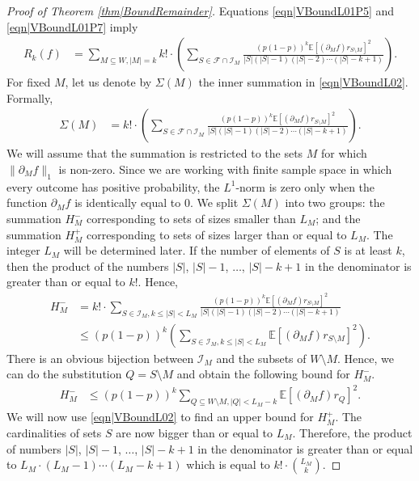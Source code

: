 \documentclass[reqno]{amsart}
\begin{document}
\begin{proof}[Proof of Theorem \ref{thm|BoundRemainder}]
Equations \eqref{eqn|VBoundL01P5} and \eqref{eqn|VBoundL01P7} imply
\begin{align}
R_k(f)
 &= \sum_{M\subseteq W, |M|=k}k!\cdot\left(\sum_{S\in\mathcal F\cap\mathcal I_M}\frac{(p(1-p))^{k}\mathbb E\left[\left(\partial_Mf\right)r_{S\setminus M}\right]^2}{|S|(|S|-1)(|S|-2)\cdots (|S|-k+1)}\right).
 \label{eqn|VBoundL02}
 \end{align}
For fixed $M$, let us denote by $\Sigma(M)$ the inner summation in \eqref{eqn|VBoundL02}. Formally, 
\begin{align}
\Sigma(M)&=k!\cdot\left(\sum_{S\in\mathcal F\cap\mathcal I_M}\frac{(p(1-p))^{k}\mathbb E\left[\left(\partial_Mf\right)r_{S\setminus M}\right]^2}{|S|(|S|-1)(|S|-2)\cdots (|S|-k+1)}\right). 
\label{eqn|DefSigmaM}
\end{align}
We will assume that the summation is restricted to the sets $M$ for which $\|\partial_Mf \|_1$ is non-zero. Since we are working with finite sample space
in which every outcome has positive probability, the $L^1$-norm is zero only when the function $\partial_Mf$ is identically equal to $0$. 
We split $\Sigma(M)$ into two groups: the summation $H_M^-$ corresponding to sets of sizes smaller than $L_M$; and the summation $H_M^+$ corresponding to sets of sizes larger than or equal to $L_M$. The integer $L_M$ will be determined later. If the number of elements of $S$ is at least $k$, then the product of the numbers 
 $|S|$, $|S|-1$, $\dots$, $|S|-k+1$ in the denominator  is greater than or equal to $k!$. Hence,
\begin{align*}
 H_M^- &= k!\cdot  \sum_{S\in\mathcal I_M, k\leq|S|<L_M}\frac{(p(1-p))^{k}\mathbb E\left[\left(\partial_Mf\right)r_{S\setminus M}\right]^2}{|S|(|S|-1)(|S|-2)\cdots (|S|-k+1)} \\
&\leq  {(p(1-p))^k} \left(\sum_{S\in\mathcal I_M, k\leq|S|<L_M}
\mathbb E\left[\left(\partial_Mf\right)r_{S\setminus M}\right]^2\right). \end{align*}
There is an obvious bijection between $\mathcal I_M$ and the subsets of $W\setminus M$. Hence, we can do the substitution $Q=S\setminus M$ and obtain the following bound for $H_M^-$.
\begin{align*}  H_M^-  &\leq {(p(1-p))^k}  \sum_{Q\subseteq W\setminus M, |Q|< L_M-k} 
\mathbb E\left[\left(\partial_Mf\right)r_{Q}\right]^2 .
\end{align*}
We will now use \eqref{eqn|VBoundL02} to find an upper bound for $H_M^+$. The cardinalities of sets $S$ are now bigger than or equal to $L_M$. 
Therefore, the product of numbers  $|S|$, $|S|-1$, $\dots$, $|S|-k+1$  in the denominator is greater than or equal to $L_M\cdot (L_M-1)\cdots (L_M-k+1)$ which is equal to $k!\cdot \binom{L_M}{k}$. 

\end{proof}
\end{document}
